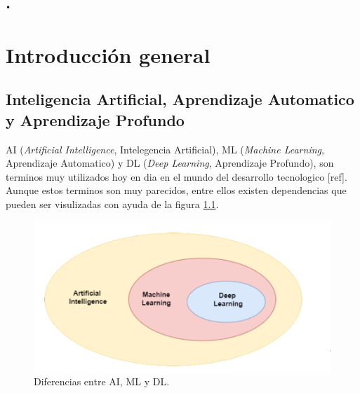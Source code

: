 \texttt{•}%

\chapter{Introducción general} %
\label{Chapter1} %
\label{IntroGeneral}


\newcommand{\keyword}[1]{\textbf{#1}}
\newcommand{\tabhead}[1]{\textbf{#1}}
\newcommand{\code}[1]{\texttt{#1}}
\newcommand{\file}[1]{\texttt{\bfseries#1}}
\newcommand{\option}[1]{\texttt{\itshape#1}}
\newcommand{\grados}{$^{\circ}$}



\section{Inteligencia Artificial, Aprendizaje Automatico y Aprendizaje Profundo}

AI (\textit{Artificial Intelligence}, Intelegencia Artificial), ML (\textit{Machine Learning}, Aprendizaje Automatico) y DL (\textit{Deep Learning}, Aprendizaje Profundo), son terminos muy utilizados hoy en dia en el mundo del desarrollo tecnologico [ref]. Aunque estos terminos son muy parecidos, entre ellos existen dependencias que pueden ser visulizadas con ayuda de la figura \ref{fig:ai_ml_dl}.

\begin{figure}[h]
	\centering
	\includegraphics[scale=0.3]{./Figures/ai_ml_dl.png}
	\caption{Diferencias entre AI, ML y DL.}
	\label{fig:ai_ml_dl}
\end{figure}

